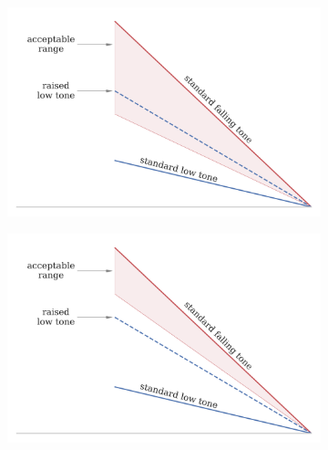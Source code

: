 \documentclass[12pt]{report}
\begin{document}
\begin{CJK}{UTF8}{bsmi}
\begin{figure}[hbt!]
\centering
\begin{subfigure}[b]{.495\textwidth}
\centering
\includegraphics[width=\textwidth]{Figures/Tone_acceptance_illustration_wide.png}
\end{subfigure}
\begin{subfigure}[b]{.495\textwidth}
\centering
\includegraphics[width=\textwidth]{Figures/Tone_acceptance_illustration_narrow.png}
\end{subfigure}


\end{figure}
\end{CJK}
\end{document}
